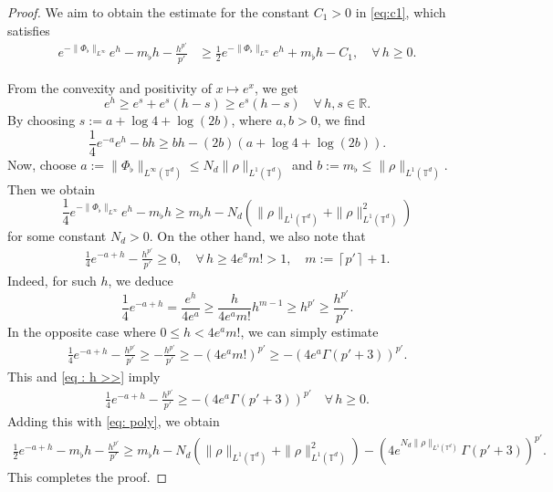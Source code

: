 \documentclass[10pt,a4paper]{amsart}
\newcommand{\R}{\mathbb{R}}
\newcommand{\T} {\mathbb T}
\begin{document}
\begin{proof}
We aim to obtain the estimate for the constant $C_1>0$ in \eqref{eq:c1}, which satisfies
\begin{align*}
e^{-\|\Phi_\flat\|_{L^\infty}}e^{h}-m_\flat h - \frac{h^{p'}}{p'} &\ge  \frac{1}{2}e^{-\|\Phi_\flat\|_{L^\infty}}e^{h} + m_\flat h -C_1, \quad \forall \, h \geq 0.
\end{align*}


From the  convexity and positivity of $x \mapsto e^x$, we get
\[
e^h \ge e^s + e^s(h-s) \ge e^s(h-s) \quad \forall \, h,s\in \R.
\]
By choosing $s:=a +\log4 + \log(2b)$, where $a,b>0$, we find
\[
\frac{1}{4}e^{-a}e^h - bh \ge bh -(2b)(a+\log4 +\log(2b)).
\]
Now, choose $a:=\|\Phi_\flat\|_{L^\infty(\T^d)}\le N_d\|\rho\|_{L^1(\T^d)}$ and $b :=m_\flat \le \|\rho\|_{L^1(\T^d)}$. Then we obtain
\begin{equation}
\label{eq: poly}
\frac{1}{4}e^{-\|\Phi_\flat\|_{L^\infty}}e^h - m_\flat h \ge m_\flat h - N_d(\|\rho\|_{L^1(\T^d)} +\|\rho\|_{L^1(\T^d)}^2)
\end{equation}
for some constant $N_d>0$. On the other hand, we also note that
\begin{align}
\label{eq : h >>}
\frac{1}{4}e^{-a+h} - \frac{h^{p'}}{p'} \ge 0,\quad \forall \, h \ge 4e^a m!>1,\quad m:= \left\lceil p' \right\rceil +1.
\end{align}
Indeed, for such $h$, we deduce
\[
\frac{1}{4}e^{-a+h} = \frac{e^h}{4e^a} \ge \frac{h}{4e^am!}h^{m-1} \ge h^{p'} \ge \frac{h^{p'}}{p'}.
\]
In the opposite case where $0\le h< 4e^a m!$, we can simply estimate
\begin{equation*}
\begin{split}
\frac{1}{4}e^{-a+h} - \frac{h^{p'}}{p'}  \ge -\frac{h^{p'}}{p'}  \ge -(4e^a m!)^{p'} \ge - (4e^a\Gamma(p'+3))^{p'}.
\end{split}
\end{equation*}
This and \eqref{eq : h >>} imply
\begin{align*}
    \frac{1}{4}e^{-a+h} - \frac{h^{p'}}{p'} \ge -(4e^a \Gamma(p' + 3))^{p'} \quad \forall \, h\ge 0.
\end{align*}
Adding this with \eqref{eq: poly}, we obtain
\begin{align*}
    \frac{1}{2}e^{-a+h} - m_\flat h - \frac{h^{p'}}{p'} \ge m_\flat h - N_d(\|\rho\|_{L^1(\T^d)} + \|\rho\|_{L^1(\T^d)}^2 ) - (4e^{N_d\|\rho\|_{L^1(\T^d)}} \Gamma(p'+3))^{p'}.
\end{align*}
This completes the proof.
\end{proof}
\end{document}
